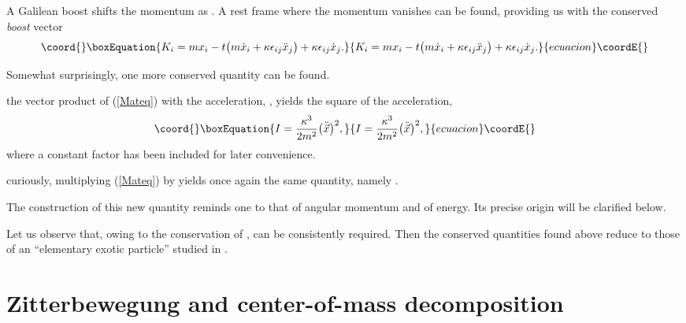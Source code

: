 \documentclass[a4paper,11pt]{article}
\let\ssection=\section
\renewcommand{\section}{\setcounter{equation}{0}\ssection}
\providecommand{\vx}{{\vec x}}
\def\vb{{\vec b}}
\def\vP{{\vec P}}
\def\vx{{\vec x}}
\begin{document}
\myHighlight{$\bullet$}\coordHE{} A Galilean boost \myHighlight{$\vx\to\vx+\vb t$}\coordHE{} shifts the momentum
as \myHighlight{$\vP\to\vP+m\vb$}\coordHE{}. A rest frame where the momentum vanishes can
be found, providing us with the conserved {\it boost} vector
\begin{equation}\coord{}\boxEquation{
     K_{i}=mx_{i}-t\big(m\dot{x}_{i}+\kappa\epsilon_{ij}\ddot{x}_{j}\big)
     +\kappa\epsilon_{ij}\dot{x}_{j}.
     \label{CM}
}{
     K_{i}=mx_{i}-t\big(m\dot{x}_{i}+\kappa\epsilon_{ij}\ddot{x}_{j}\big)
     +\kappa\epsilon_{ij}\dot{x}_{j}.
     }{ecuacion}\coordE{}\end{equation}

Somewhat surprisingly, one more conserved quantity can be found.

\myHighlight{$\bullet$}\coordHE{}  the vector product of
(\ref{Mateq}) with the acceleration, \myHighlight{$\ddot{\vx}$}\coordHE{},
yields the square of the acceleration,
\begin{equation}\coord{}\boxEquation{
     I=\frac{\kappa^3}{2m^2}\big(\ddot{\vx}\big)^2,
     \label{intangmom}
}{
     I=\frac{\kappa^3}{2m^2}\big(\ddot{\vx}\big)^2,
     }{ecuacion}\coordE{}\end{equation}
where a constant factor
has been included for later convenience.

\myHighlight{$\bullet$}\coordHE{} curiously, multiplying (\ref{Mateq}) by \myHighlight{$\dddot{\vx}$}\coordHE{} yields
once again the same  quantity, namely
\myHighlight{$(m/2)\big(\ddot{\vx}\big)^2=(m/\kappa)^3I$}\coordHE{}.

The construction of this new quantity reminds one to that
of  angular momentum and of energy.
Its precise origin will be clarified below.

Let us observe that, owing to the conservation
of \coordHE{}, \myHighlight{$\ddot{\vx}=0$}\coordHE{} can be consistently required.
Then the conserved quantities found above
reduce to those of an ``elementary exotic particle'' studied
in \cite{DH}.



\section{Zitterbewegung and center-of-mass
decomposition}\label{NRmotion}
\end{document}
